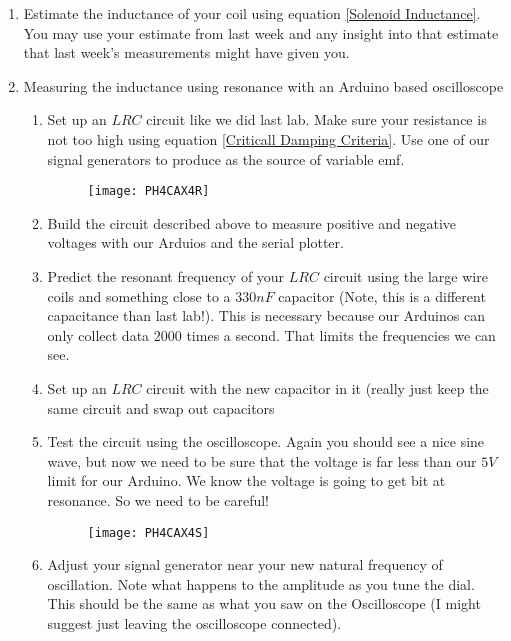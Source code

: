 \begin{enumerate}
\item Estimate the inductance of your coil using equation \ref{Solenoid
Inductance}. You may use your estimate from last week and any insight into
that estimate that last week's measurements might have given you.

\item Measuring the inductance using resonance with an Arduino based
oscilloscope

\begin{enumerate}
\item Set up an $LRC$ circuit like we did last lab. Make sure your
resistance is not too high using equation \ref{Criticall Damping Criteria}.
Use one of our signal generators to produce as the source of variable emf. 
\begin{figure}[h!]
\texttt{[image: PH4CAX4R]}
\end{figure}

\item Build the circuit described above to measure positive and negative
voltages with our Arduios and the serial plotter.

\item Predict the resonant frequency of your $LRC$ circuit using the large
wire coils and something close to a $330\unit{nF}$ capacitor (Note, this is
a different capacitance than last lab!). This is necessary because our
Arduinos can only collect data $2000$ times a second. That limits the
frequencies we can see.

\item Set up an $LRC$ circuit with the new capacitor in it (really just keep
the same circuit and swap out capacitors

\item Test the circuit using the oscilloscope. Again you should see a nice
sine wave, but now we need to be sure that the voltage is far less than our $%
5\unit{V}$ limit for our Arduino. We know the voltage is going to get bit at
resonance. So we need to be careful! \begin{figure}[h!]
\texttt{[image: PH4CAX4S]}
\end{figure}

\item Adjust your signal generator near your new natural frequency of
oscillation. Note what happens to the amplitude as you tune the dial. This
should be the same as what you saw on the Oscilloscope (I might suggest just
leaving the oscilloscope connected).


\end{enumerate}
\end{enumerate}
